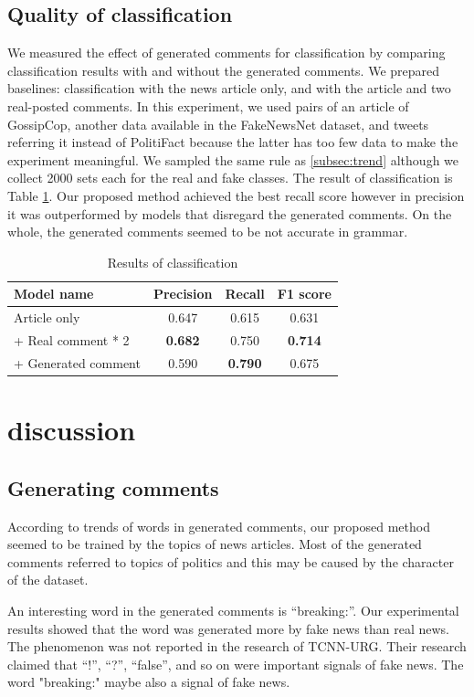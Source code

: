 \documentclass[conference]{IEEEtran}
\begin{document}
\subsection{Quality of classification}
We measured the effect of generated comments for classification by comparing classification results with and without the generated comments.
We prepared baselines: classification with the news article only, and with the article and two real-posted comments.
In this experiment, we used pairs of an article of
GossipCop, another data available in the FakeNewsNet dataset, and tweets referring it instead of PolitiFact because the latter has too few data to make the experiment meaningful.
We sampled the same rule as \ref{subsec:trend} although we collect 2000 sets each for the real and fake classes.
The result of classification is Table \ref{tbl:classify_results}.
Our proposed method achieved the best recall score however in precision it was outperformed by models that disregard the generated comments.
On the whole, the generated comments seemed to be not accurate in grammar.

\begin{table}[!t]
    \renewcommand{\arraystretch}{1.3}
    \caption{Results of classification}
    \label{tbl:classify_results}
    \centering
    \begin{tabular}{lccc}
    \hline
    Model name           & Precision & Recall & F1 score \\ \hline
    Article only         & 0.647     & 0.615  & 0.631    \\
     + Real comment * 2  & \textbf{0.682}     & 0.750  & \textbf{0.714}    \\
     + Generated comment & 0.590     & \textbf{0.790}  & 0.675    \\ \hline
    \end{tabular}
    \end{table}
\section{discussion}
\subsection{Generating comments}
According to trends of words in generated comments,
our proposed method seemed to be trained by the topics of news articles.
Most of the generated comments referred to topics of politics and this may be caused by the character of the dataset.

An interesting word in the generated comments is ``breaking:''.
Our experimental results showed that the word was generated more by fake news than real news.
The phenomenon was not reported in the research of TCNN-URG\cite{ijcai2018-533}.
Their research claimed that ``!'', ``?'', ``false'', and so on were important signals of fake news.
The word "breaking:" maybe also a signal of fake news.
\end{document}
